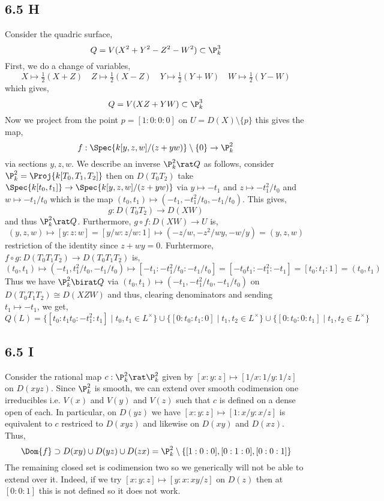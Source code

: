 \documentclass[12pt]{article}
\begin{document}
\subsection{6.5 H}

Consider the quadric surface,
\[ Q = V(X^2 + Y^2 - Z^2 - W^2) \subset \P^3_k \]
First, we do a change of variables,
\[ X \mapsto \tfrac{1}{2}(X + Z) \quad Z \mapsto \tfrac{1}{2}(X - Z) \quad Y \mapsto \tfrac{1}{2}(Y + W) \quad W \mapsto \tfrac{1}{2}(Y - W) \]
which gives,
\[ Q = V(XZ + YW) \subset \P^3_k \]
Now we project from the point $p = [1 : 0 : 0 : 0]$ on $U = D(X) \setminus \{ p \}$ this gives the map, 
\[ f : \Spec{k[y, z, w]/(z + yw)} \setminus \{ 0 \} \to \P^2_k \]
via sections $y, z, w$. We describe an inverse $\P^2_k \rat Q$ as follows, consider $\P^2_k = \Proj{k[T_0, T_1, T_2]}$ then on $D(T_0 T_2)$ take $\Spec{k[t_0, t_1]} \to \Spec{k[y,z,w]/(z + yw)}$ via $y \mapsto -t_1$ and $z \mapsto -t_1^2/t_0$ and $w \mapsto -t_1 / t_0$ which is the map $(t_0, t_1) \mapsto (-t_1, -t_1^2/t_0, -t_1/t_0)$. This gives,
\[ g : D(T_0 T_2) \to D(XW) \]
and thus $\P^2_k \rat Q$. Furthermore, $g \circ f : D(XW) \to U$ is,
\[ (y, z, w) \mapsto [y : z : w] = [y/w : z/w : 1] \mapsto (-z/w, -z^2/wy, -w/y) = (y, z, w) \] restriction of the identity since $z + wy = 0$. Furhtermore, $f \circ g : D(T_0 T_1 T_2) \to D(T_0 T_1 T_2)$ is,
\[ (t_0, t_1) \mapsto (-t_1, t_1^2/t_0, -t_1/t_0) \mapsto [-t_1 : -t_1^2/t_0 : -t_1/t_0] = [-t_0 t_1 : -t_1^2 : -t_1] = [ t_0 : t_1 : 1] = (t_0, t_1) \]
Thus we have $\P^2_k \birat Q$ via $(t_0, t_1) \mapsto (-t_1, -t_1^2/t_0, -t_1/t_0)$ on $D(T_0 T_1 T_2) \cong D(XZW)$ and thus, clearing denominators and sending $t_1 \mapsto - t_1$, we get,
\[ Q(L) = \{ [t_0 : t_1 t_0 : - t_1^2 : t_1] \mid t_0, t_1 \in L^\times \} \cup \{ [0 : t_0 : t_1 : 0] \mid t_1, t_2 \in L^\times \} \cup \{ [0 : t_0 : 0 : t_1] \mid t_1, t_2 \in L^\times \} \]

\subsection{6.5 I}

Consider the rational map $c : \P^2_k \rat \P^2_k$ given by $[x : y : z] \mapsto [1/x : 1/y : 1/z]$ on $D(xyz)$. Since $\P^2_k$ is smooth, we can extend over smooth codimension one irreducibles i.e. $V(x)$ and $V(y)$ and $V(z)$ such that $c$ is defined on a dense open of each. In particular, on $D(yz)$ we have $[x : y : z] \mapsto [1 : x/y : x/z]$ is equivalent to $c$ restriced to $D(xyz)$ and likewise on $D(xy)$ and $D(xz)$. Thus,
\[ \Dom{f} \supset D(xy) \cup D(yz) \cup D(zx) = \P^2_k \setminus \{ [1 : 0 : 0], [0 : 1 : 0], [0 : 0 : 1] \} \]
The remaining closed set is codimension two so we generically will not be able to extend over it. Indeed, if we try $[x : y : z] \mapsto  [y : x : xy / z]$ on $D(z)$ then at $[0 : 0 : 1]$ this is not defined so it does not work.
\end{document}
